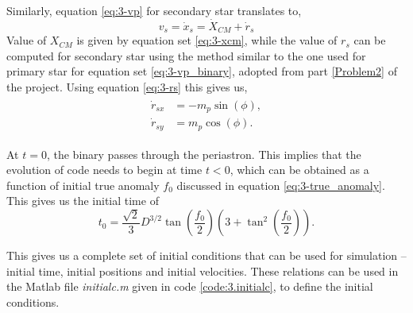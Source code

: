 \documentclass[a4paper]{article}
\begin{document}
\begin{enumerate} [label*=\textbf{(\alph*)}]
					Similarly, equation \ref{eq:3-vp} for secondary star translates to,
					\begin{equation}
						v_s = \dot{x}_s = \dot{X}_{CM}^{} + \dot{r}_s
						\label{eq:3-vs}
					\end{equation}
					Value of \(X_{CM}^{}\) is given by equation set \ref{eq:3-xcm}, while the value of \(r_s\) can be computed for secondary star using the method similar to the one used for primary star for equation set \ref{eq:3-vp_binary}, adopted from part \ref{Problem2} of the project. Using equation \ref{eq:3-rs} this gives us,
					\begin{equation}
						\begin{gathered}
							\begin{aligned}
								\dot{r}_{sx} &= -m_p \sin(\phi), \\
								\dot{r}_{sy} &= m_p \cos(\phi).
							\end{aligned}
						\end{gathered} 
						\label{eq:3-vs_binary}
					\end{equation}
				
					At \(t=0\), the binary passes through the periastron. This implies that the evolution of code needs to begin at time \(t<0\), which can be obtained as a function of initial true anomaly \(f_0\) discussed in equation \ref{eq:3-true_anomaly}. This gives us the initial time of 
					\begin{equation}
						t_0 = \frac{\sqrt{2}}{3} D^{3/2} \tan \left( \frac{f_0}{2} \right) \left( 3+ \tan^2 \left( \frac{f_0}{2} \right) \right) .
						\label{eq:3-initial_time}
					\end{equation}
				
					This gives us a complete set of initial conditions that can be used for simulation -- initial time, initial positions and initial velocities. These relations can be used in the Matlab file \emph{initialc.m} given in code \ref{code:3.initialc}, to define the initial conditions. \\
					

\end{enumerate}
\end{document}
